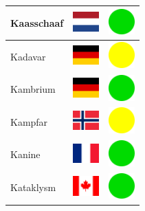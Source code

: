 \documentclass[12pt, a4paper, twoside]{report}
\begin{document}
\begin{center}
\begin{longtable}{|p{5cm}|p{2cm}|p{2cm}|}
Kaasschaaf & \includegraphics[width=1cm]{4x3/nl} & \includegraphics[width=1cm]{likes/y} \\ \hline
Kadavar & \includegraphics[width=1cm]{4x3/de} & \includegraphics[width=1cm]{likes/m} \\ \hline
Kambrium & \includegraphics[width=1cm]{4x3/de} & \includegraphics[width=1cm]{likes/y} \\ \hline
Kampfar & \includegraphics[width=1cm]{4x3/no} & \includegraphics[width=1cm]{likes/m} \\ \hline
Kanine & \includegraphics[width=1cm]{4x3/fr} & \includegraphics[width=1cm]{likes/y} \\ \hline
Kataklysm & \includegraphics[width=1cm]{4x3/ca} & \includegraphics[width=1cm]{likes/y} \\ \hline

\end{longtable}
\end{center}
\end{document}
